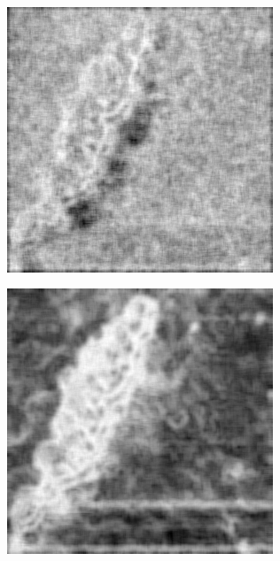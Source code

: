 \documentclass[../main.tex]{subfiles}
\begin{document}
\begin{figure}[!ht]
\begin{subfigure}{0.3\linewidth}
	\end{subfigure}\\[20pt]
	\begin{subfigure}{0.3\linewidth}
		\centering
		\includegraphics[keepaspectratio, width=\linewidth]{images/orig_entropy.png}
	\end{subfigure}
	\hfill
	\begin{subfigure}{0.3\linewidth}
		\centering
		\includegraphics[keepaspectratio, width=\linewidth]{images/nlm_entropy.png}

\end{subfigure}
\end{figure}
\end{document}
